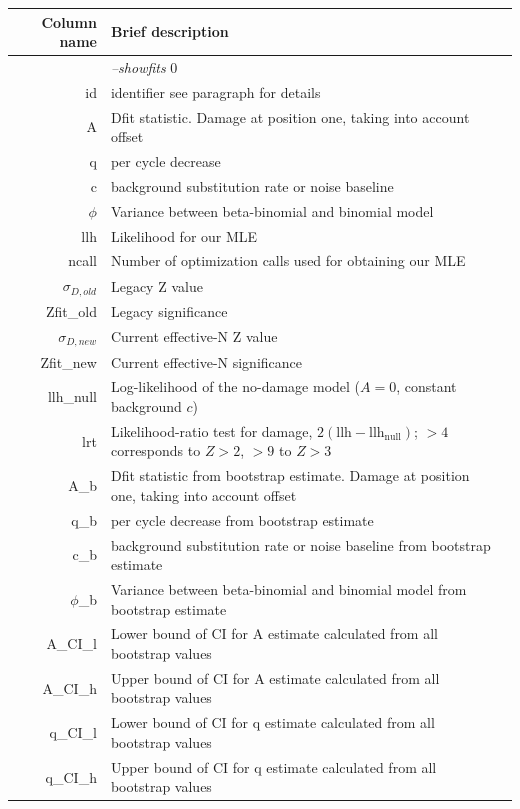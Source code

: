 \documentclass[10pt]{article}
\begin{document}
\begin{table}[h]
\begin{tabular}{rll}
  \hline
  {\bf Column name} & {\bf Brief description} \\
  \hline
  {\sf } & \textit{--showfits} 0 \\ \hline  
  {\sf id} & identifier see paragraph for details\\
  {\sf A} & Dfit statistic. Damage at position one, taking into account offset\\
  {\sf q} & per cycle decrease\\
  {\sf c} & background substitution rate or noise baseline\\ 
  {\sf $\phi$} & Variance between beta-binomial and binomial model\\
  {\sf llh} & Likelihood for our MLE\\
  {\sf ncall} & Number of optimization calls used for obtaining our MLE\\
  {\sf $\sigma_{D,old}$} & Legacy Z value\\
  {\sf Zfit\_old} & Legacy significance\\
  {\sf $\sigma_{D,new}$} & Current effective-N Z value\\
  {\sf Zfit\_new} & Current effective-N significance\\
  {\sf llh\_null} & Log-likelihood of the no-damage model ($A=0$, constant background $c$)\\
  {\sf lrt} & Likelihood-ratio test for damage, $2(\mathrm{llh}-\mathrm{llh_{null}})$; $>4$ corresponds to $Z>2$, $>9$ to $Z>3$\\
  {\sf A\_b} & Dfit statistic from bootstrap estimate. Damage at position one, taking into account offset\\
  {\sf q\_b} & per cycle decrease from bootstrap estimate\\
  {\sf c\_b} & background substitution rate or noise baseline from bootstrap estimate\\ 
  {\sf $\phi$\_b} & Variance between beta-binomial and binomial model from bootstrap estimate\\
  {\sf A\_CI\_l} & Lower bound of CI for A estimate calculated from all bootstrap values \\
  {\sf A\_CI\_h} & Upper bound of CI for A estimate calculated from all bootstrap values \\
  {\sf q\_CI\_l} & Lower bound of CI for q estimate calculated from all bootstrap values \\
  {\sf q\_CI\_h} & Upper bound of CI for q estimate calculated from all bootstrap values \\

\end{tabular}
\end{table}
\end{document}
